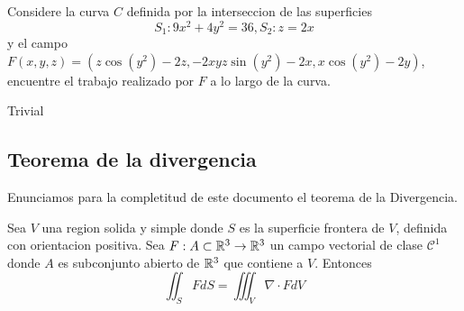 \documentclass[../main.tex]{subfiles}
\begin{document}
\begin{problem}
  Considere la curva $C$ definida por la interseccion de las superficies
  \begin{equation*}
    S_{1}: 9x^{2} + 4y^{2} = 36, S_{2} : z = 2x
  \end{equation*}
  y el campo $F(x, y, z) = (z \cos(y^{2}) - 2z, -2xyz \sin(y^{2}) - 2x, x \cos(y^{2}) -2y)$, encuentre el trabajo realizado por $F$ a lo largo de la curva.
\end{problem}
\begin{solution}
Trivial
\end{solution}

\subsection{Teorema de la divergencia}
Enunciamos para la completitud de este documento el teorema de la Divergencia.
\begin{teorema}[Divergencia]
  Sea $V$ una region solida y simple donde $S$ es la superficie frontera de $V$, definida con orientacion positiva. Sea $F: A \subset \mathbb{R}^{3} \to \mathbb{R}^{3}$ un campo vectorial de clase $\mathcal{C}^{1}$ donde $A$ es subconjunto abierto de $\mathbb{R}^{3}$ que contiene a $V$. Entonces
  \begin{equation*}
    \iint_{S} F dS = \iiint_{V} \nabla \cdot F dV
  \end{equation*}
\end{teorema}
\end{document}
